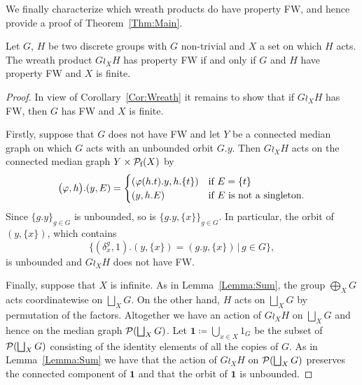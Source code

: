 We finally characterize which wreath products do have property FW, and hence provide a proof of Theorem~\ref{Thm:Main}.
\begin{prop}\label{Prop:Median}
Let $G$, $H$ be two discrete groups with $G$ non-trivial and $X$ a set on which $H$ acts. The wreath product $G \wr_X H$ has property FW if and only if $G$ and $H$ have property FW and $X$ is finite.
\end{prop}
\begin{proof}
In view of Corollary~\ref{Cor:Wreath} it remains to show that if $G\wr_X H$ has FW, then $G$ has FW and $X$ is finite.

Firstly, suppose that $G$ does not have FW and let $Y$ be a connected median graph on which $G$ acts with an unbounded orbit $G.y$.
Then $G\wr_X H$ acts on the connected median graph $Y\times \powersetf{X}$ by
\[
	\bigl(\phi,h\bigr).(y,E)=
	\begin{cases}
	(\phi(h.t).y,h.\{t\})&\textnormal{if $E=\{t\}$}\\
	(y,h.E)&\textnormal{if $E$ is not a singleton.}
	\end{cases}
\]
Since $\{g.y\}_{g\in G}$ is unbounded, so is $\{g.y,\{x\}\}_{g\in G}$.
In particular, the orbit of $(y,\{x\})$, which contains
\[
	\{(\delta_{x}^g,1).(y,\{x\})=(g.y,\{x\})\,|\,g\in G\},
\]
is unbounded and $G\wr_X H$ does not have FW.
%

Finally, suppose that $X$ is infinite.
As in Lemma~\ref{Lemma:Sum}, the group $\bigoplus_XG$ acts coordinatewise on  $\bigsqcup_XG$. On the other hand, $H$ acts on $\bigsqcup_XG$ by permutation of the factors.
Altogether we have an action of $G\wr_XH$ on $\bigsqcup_XG$ and hence on the median graph $\powerset{\bigsqcup_XG}$.
Let $\mathbf 1\coloneqq\bigcup_{x\in X} 1_{G}$ be the subset of $\powerset{\bigsqcup_XG}$ consisting of the identity elements of all the copies of $G$.
As in Lemma~\ref{Lemma:Sum} we have that the action of $G\wr_XH$ on $\powerset{\bigsqcup_XG}$ preserves the connected component of $\mathbf 1$
and that the orbit of $\mathbf 1$ is unbounded.
\end{proof}

